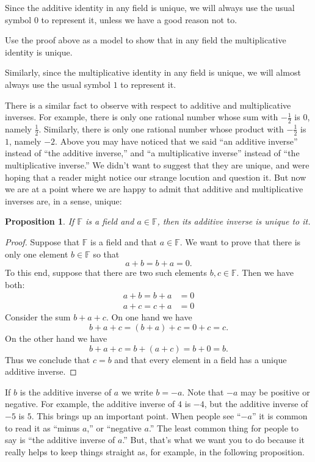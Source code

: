 \documentclass[11pt]{article}
\newenvironment{task}
	{\begin{mdframed}[linecolor=lightgray, linewidth=3pt]\raggedright}
	{\end{mdframed}}
\newtheorem{proposition}[theorem]{Proposition}
\theoremstyle{definition}
\begin{document}
Since the additive identity in any field is unique, we will always use the usual symbol $0$ to represent it, unless we have a good reason not to. 

\begin{task}
  Use the proof above as a model to show that in any field the multiplicative identity is unique.
\end{task}

Similarly, since the multiplicative identity in any field is unique, we will almost always use the usual symbol $1$ to represent it. 

There is a similar fact to observe with respect to additive and multiplicative inverses. For example, there is only one rational number whose sum with
$-\frac{1}{2}$ is 0, namely $\frac{1}{2}$. Similarly, there is only one rational number whose product with $-\frac{1}{2}$ is $1$, namely $-2$. 
Above you may have noticed that we said ``an additive inverse'' instead of ``the additive inverse,'' and
``a multiplicative inverse'' instead of ``the multiplicative inverse.'' We didn't want to suggest that they are unique, and were hoping that a reader might notice
our strange locution and question it. But now we are at a point where we are happy to admit that additive and multiplicative inverses are, in a sense, unique:

\begin{proposition}
  If $\mathbb{F}$ is a field and $a\in \mathbb{F}$, then its additive inverse is unique to it.
\end{proposition}
\begin{proof}
  Suppose that $\mathbb{F}$ is a field and that $a\in\mathbb{F}$. We want to prove that there is only one element $b\in\mathbb{F}$ so that
  \[ a+b=b+a=0.\]
  To this end, suppose that there are two such elements $b,c\in\mathbb{F}$. Then we have both:
  \begin{align*}
    a + b = b + a &= 0\\
    a + c = c + a &= 0
  \end{align*}
  Consider the sum $b + a + c$. On one hand we have
  \[ b + a + c = (b+a) + c = 0 + c = c.\]
  On the other hand we have
  \[ b + a + c = b+ (a + c) = b + 0 = b.\]
  Thus we conclude that $c=b$ and that every element in a field has a unique additive inverse.
\end{proof}

If $b$ is the additive inverse of $a$ we write $b = -a$. Note that $-a$ may be positive or negative. For example,
the additive inverse of $4$ is $-4$, but the additive inverse of $-5$ is $5$. This brings up an important point. 
When people see ``$-a$'' it is common to read it as ``minus $a$,'' or ``negative $a$.'' The least common thing for
people to say is ``the additive inverse of $a$.'' But, that's what we want you to do because it really helps to 
keep things straight as, for example, in the following proposition.
\end{document}
